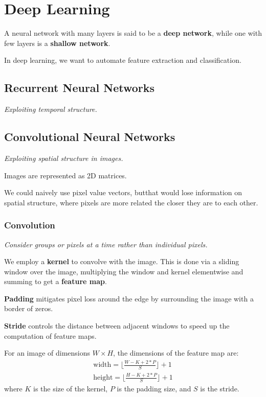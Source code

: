 \section{Deep Learning}
A neural network with many layers is said to be a \textbf{deep network},
while one with few layers is a \textbf{shallow network}.

In deep learning, we want to automate feature extraction and classification.

\subsection{Recurrent Neural Networks}
\emph{Exploiting temporal structure.}

\subsection{Convolutional Neural Networks}
\emph{Exploiting spatial structure in images.}

Images are represented as 2D matrices.

We could naively use pixel value vectors, butthat would lose information on spatial structure, where pixels are more related the
closer they are to each other.

\subsubsection{Convolution}
\emph{Consider groups or pixels at a time rather than individual pixels.}

We employ a \textbf{kernel} to convolve with the image.
This is done via a sliding window over the image, multiplying the window and kernel
elementwise and summing to get a \textbf{feature map}.

\textbf{Padding} mitigates pixel loss around the edge by surrounding the image with
a border of zeros.

\textbf{Stride} controls the distance between adjacent windows to speed up the
computation of feature maps.

For an image of dimensions $W \times H$, the dimensions of the feature map are:
\begin{align*}
    \text{width} = \lfloor \frac{W - K + 2*P}{S} \rfloor + 1 \\
    \text{height} = \lfloor \frac{H - K + 2*P}{S} \rfloor + 1
\end{align*}
where $K$ is the size of the kernel, $P$ is the padding size, and $S$ is the stride.

